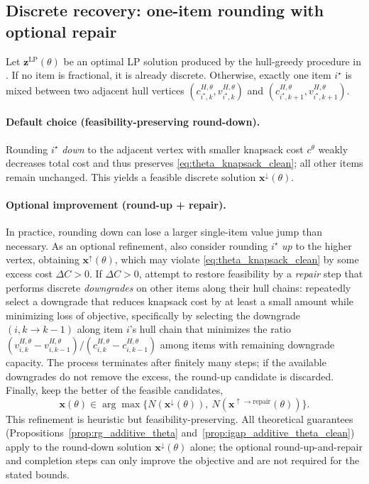 \documentclass[11pt, a4paper]{article}
\theoremstyle{plain}
\theoremstyle{definition}
\theoremstyle{remark}
\begin{document}
\subsection{Discrete recovery: one-item rounding with optional repair}\label{subsec:rounding}

Let $\bm z^{\mathrm{LP}}(\theta)$ be an optimal LP solution produced by the hull-greedy procedure in .
If no item is fractional, it is already discrete. Otherwise, exactly one item $i^\star$ is mixed between two adjacent hull vertices
$(c^{H,\theta}_{i^\star,k},v^{H,\theta}_{i^\star,k})$ and $(c^{H,\theta}_{i^\star,k+1},v^{H,\theta}_{i^\star,k+1})$.

\paragraph{Default choice (feasibility-preserving round-down).}
Rounding $i^\star$ \emph{down} to the adjacent vertex with smaller knapsack cost $c^\theta$ weakly decreases total cost and thus preserves
\eqref{eq:theta_knapsack_clean}; all other items remain unchanged. This yields a feasible discrete solution $\bm x^{\downarrow}(\theta)$.

\paragraph{Optional improvement (round-up + repair).}
In practice, rounding down can lose a larger single-item value jump than necessary. As an optional refinement, also consider rounding
$i^\star$ \emph{up} to the higher vertex, obtaining $\bm x^{\uparrow}(\theta)$, which may violate \eqref{eq:theta_knapsack_clean} by some
excess cost $\Delta C>0$. If $\Delta C>0$, attempt to restore feasibility by a \emph{repair} step that performs discrete \emph{downgrades} on other
items along their hull chains: repeatedly select a downgrade that reduces knapsack cost by at least a small amount while minimizing loss of
objective, specifically by selecting the downgrade $(i, k \to k{-}1)$ along item $i$'s hull chain that minimizes the ratio
$(v^{H,\theta}_{i,k}-v^{H,\theta}_{i,k-1})/(c^{H,\theta}_{i,k}-c^{H,\theta}_{i,k-1})$ among items with remaining downgrade capacity.  The
process terminates after finitely many steps; if the available downgrades do not remove the excess, the round-up candidate is discarded.
Finally, keep the better of the feasible candidates,
\[
\bm x(\theta)\in\arg\max\{N(\bm x^{\downarrow}(\theta)),\ N(\bm x^{\uparrow\!\to\!\mathrm{repair}}(\theta))\}.
\]
This refinement is heuristic but feasibility-preserving. All theoretical guarantees (Propositions~\ref{prop:rg_additive_theta} and~\ref{prop:igap_additive_theta_clean}) apply to the round-down solution $\bm x^{\downarrow}(\theta)$ alone; the optional round-up-and-repair and completion steps can only improve the objective and are not required for the stated bounds.
\end{document}

